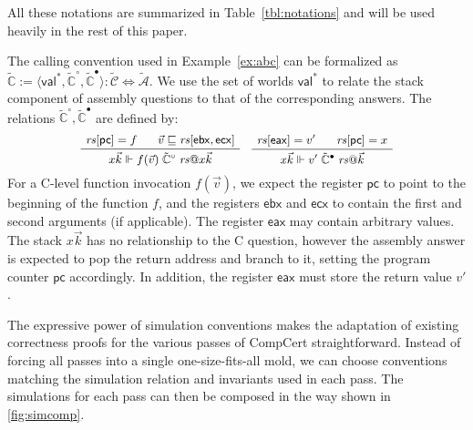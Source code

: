 \documentclass[sigplan,screen,review]{acmart}
\newcommand{\figsize}{\small}
\newcommand{\kw}[1]{\ensuremath{ \mathsf{#1} }}
\newcommand{\que}{\circ}
\newcommand{\ans}{\bullet}
\begin{document}
All these notations are summarized in Table~\ref{tbl:notations} and
will be used heavily in the rest of this paper.

\begin{example} %
The calling convention used in Example~\ref{ex:abc}
can be formalized as %
$\tilde{\mathbb{C}} :=
  \langle \kw{val}^*, \tilde{\mathbb{C}}^\que, \tilde{\mathbb{C}}^\ans \rangle :
    \tilde{\mathcal{C}} \Leftrightarrow \tilde{\mathcal{A}}$.
We use the set of worlds $\kw{val}^*$
to relate the stack component of
assembly questions to that of the corresponding answers.
The relations $\tilde{\mathbb{C}}^\que, \tilde{\mathbb{C}}^\ans$
are defined by:
\[
  \figsize
  \AxiomC{$\mathit{rs}[\kw{pc}] = f$}
  \AxiomC{\hspace{-1em} $\vec{v} \sqsubseteq \mathit{rs}[\kw{ebx}, \kw{ecx}]$}
  \BinaryInfC{$
    x \vec{k} \Vdash
    f(\vec{v}) \mathrel{\tilde{\mathbb{C}}^\que} \mathit{rs}@ x \vec{k}
  $}
  \DisplayProof
  \quad
  \AxiomC{$\mathit{rs}[\kw{eax}] = v'$}
  \AxiomC{\hspace{-1em} $\mathit{rs}[\kw{pc}] = x$}
  \BinaryInfC{$
    x \vec{k} \Vdash
    v' \mathrel{\tilde{\mathbb{C}}^\ans} \mathit{rs}@\vec{k}
  $}
  \DisplayProof
\]
For a C-level function invocation $f(\vec{v})$,
we expect the register $\kw{pc}$ to point to
the beginning of the function $f$,
and the registers $\kw{ebx}$ and $\kw{ecx}$
to contain the first and second arguments (if applicable).
The register $\kw{eax}$ may contain arbitrary values.
The stack $x \vec{k}$ has no relationship to the C question,
however the assembly answer is expected to pop the return address
and branch to it, setting the program counter $\kw{pc}$ accordingly.
In addition,
the register $\kw{eax}$
must store
the return value $v'$.
\end{example}

The expressive power of simulation conventions
makes the adaptation of existing correctness proofs
for the various passes of CompCert straightforward.
Instead of forcing all passes into a single one-size-fits-all mold,
we can choose conventions matching
the simulation relation and invariants
used in each pass.
The simulations for each pass can then be composed
in the way shown in \autoref{fig:simcomp}.
\end{document}
